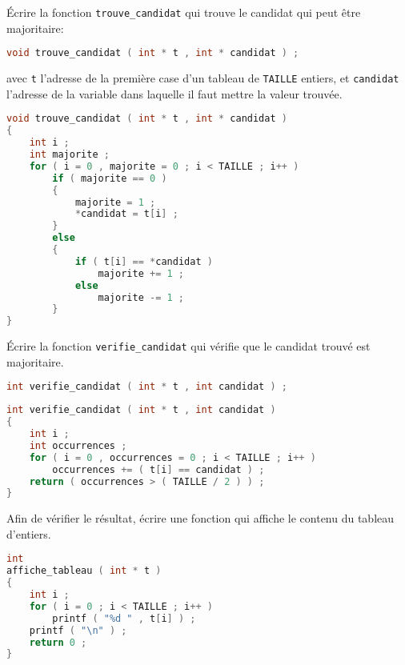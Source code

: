\question Écrire la fonction \texttt{trouve\_candidat} qui trouve
le candidat qui peut être majoritaire: 
\begin{lstlisting}[language=C]
void trouve_candidat ( int * t , int * candidat ) ;  
\end{lstlisting}
avec \texttt{t} l'adresse de la première case d'un tableau de
\texttt{TAILLE} entiers, et \texttt{candidat} l'adresse de la variable
dans laquelle il faut mettre la valeur trouvée.

\begin{solution}
  \begin{lstlisting}[language=C]
void trouve_candidat ( int * t , int * candidat )
{
    int i ;
    int majorite ;
    for ( i = 0 , majorite = 0 ; i < TAILLE ; i++ )
        if ( majorite == 0 )
        {
            majorite = 1 ;
            *candidat = t[i] ;
        }
        else
        {
            if ( t[i] == *candidat )
                majorite += 1 ;
            else
                majorite -= 1 ;
        }
}    
  \end{lstlisting}
\end{solution}

\question Écrire la fonction \texttt{verifie\_candidat} qui vérifie
que le candidat trouvé est majoritaire.
\begin{lstlisting}[language=C]
int verifie_candidat ( int * t , int candidat ) ;  
\end{lstlisting}

\begin{solution}
  \begin{lstlisting}[language=C]
int verifie_candidat ( int * t , int candidat )
{
    int i ;
    int occurrences ;
    for ( i = 0 , occurrences = 0 ; i < TAILLE ; i++ )
        occurrences += ( t[i] == candidat ) ;
    return ( occurrences > ( TAILLE / 2 ) ) ;
}    
  \end{lstlisting}
\end{solution}

\question Afin de vérifier le résultat, écrire une fonction qui
affiche le contenu du tableau d'entiers.

\begin{solution}
  \begin{lstlisting}[language=C]
int
affiche_tableau ( int * t )
{
    int i ;
    for ( i = 0 ; i < TAILLE ; i++ )
        printf ( "%d " , t[i] ) ;
    printf ( "\n" ) ;
    return 0 ;
}
  \end{lstlisting}
\end{solution}

